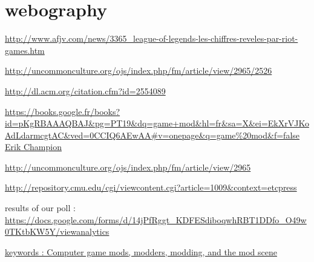 \documentclass[a4paper,12pt]{article}
\begin{document}
\section{webography}
\url{http://www.afjv.com/news/3365_league-of-legends-les-chiffres-reveles-par-riot-games.htm}

\url{http://uncommonculture.org/ojs/index.php/fm/article/view/2965/2526}

\url{http://dl.acm.org/citation.cfm?id=2554089}

\url{https://books.google.fr/books?id=pKgRBAAAQBAJ&pg=PT19&dq=game+mod&hl=fr&sa=X&ei=EkXrVJKoAdLdarmcgtAC&ved=0CCIQ6AEwAA#v=onepage&q=game%20mod&f=false Erik Champion}

\url{http://uncommonculture.org/ojs/index.php/fm/article/view/2965}

\url{http://repository.cmu.edu/cgi/viewcontent.cgi?article=1009&context=etcpress}

results of our poll :
\url{https://docs.google.com/forms/d/14jPfRggt_KDFESdiboqwhRBT1DDfo_O49w0TKtbKW5Y/viewanalytics}

\url{keywords : Computer game mods, modders, modding, and the mod scene}
\end{document}
